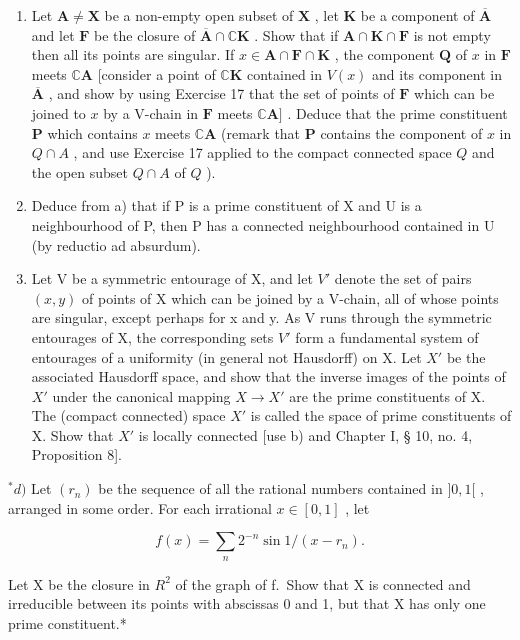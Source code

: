 \begin{enumerate}
\def\labelenumi{\alph{enumi})}
\item
  Let \(\mathbf{A} \neq \mathbf{X}\) be a non-empty open subset of \(\mathbf{X}\) , let \(\mathbf{K}\) be a component of \(\overline{\mathbf{A}}\) and let \(\mathbf{F}\) be the closure of \(\overline{\mathbf{A}} \cap \mathbb{C}\mathbf{K}\) . Show that if \(\mathbf{A} \cap \mathbf{K} \cap \mathbf{F}\) is not empty then all its points are singular. If \(x \in \mathbf{A} \cap \mathbf{F} \cap \mathbf{K}\) , the component \(\mathbf{Q}\) of \(x\) in \(\mathbf{F}\) meets \(\mathbb{C}\mathbf{A}\) {[}consider a point of \(\mathbb{C}\mathbf{K}\) contained in \(V(x)\) and its component in \(\overline{\mathbf{A}}\) , and show by using Exercise 17 that the set of points of \(\mathbf{F}\) which can be joined to \(x\) by a V-chain in \(\mathbf{F}\) meets \(\mathbb{C}\mathbf{A}]\) . Deduce that the prime constituent \(\mathbf{P}\) which contains \(x\) meets \(\mathbb{C}\mathbf{A}\) (remark that \(\mathbf{P}\) contains the component of \(x\) in \(Q \cap A\) , and use Exercise 17 applied to the compact connected space \(Q\) and the open subset \(Q \cap A\) of \(Q\) ).
\item
  Deduce from a) that if P is a prime constituent of X and U is a neighbourhood of P, then P has a connected neighbourhood contained in U (by reductio ad absurdum).
\item
  Let V be a symmetric entourage of X, and let \(V'\) denote the set of pairs \((x, y)\) of points of X which can be joined by a V-chain, all of whose points are singular, except perhaps for x and y. As V runs through the symmetric entourages of X, the corresponding sets \(V'\) form a fundamental system of entourages of a uniformity (in general not Hausdorff) on X. Let \(X'\) be the associated Hausdorff space, and show that the inverse images of the points of \(X'\) under the canonical mapping \(X \rightarrow X'\) are the prime constituents of X. The (compact connected) space \(X'\) is called the space of prime constituents of X. Show that \(X'\) is locally connected {[}use b) and Chapter I, § 10, no. 4, Proposition 8{]}.
\end{enumerate}

\(^{*}d)\) Let \((r_{n})\) be the sequence of all the rational numbers contained in \(]0,1[\) , arranged in some order. For each irrational \(x\in[0,1]\) , let

\[
f (x) = \sum_ {n} 2 ^ {- n} \sin 1 / (x - r _ {n}).
\]

Let X be the closure in \(R^{2}\) of the graph of f.~Show that X is connected and irreducible between its points with abscissas 0 and 1, but that X has only one prime constituent.*

